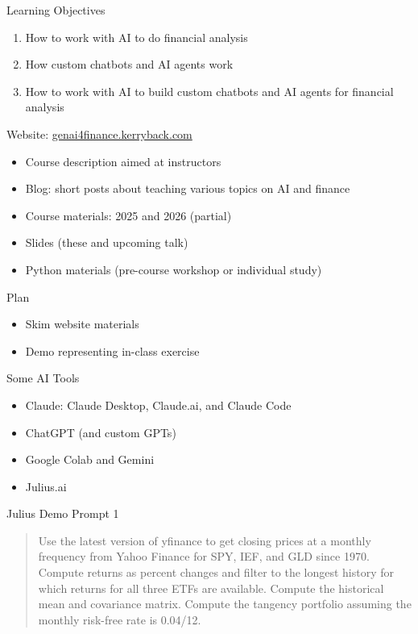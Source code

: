 \documentclass{beamer}
\begin{document}
\begin{frame}{Learning Objectives}
\begin{enumerate}
\item How to work with AI to do financial analysis
\item How custom chatbots and AI agents work 
\item How to work with AI to build custom chatbots and AI agents for financial analysis
\end{enumerate}
\end{frame}

\begin{frame}{Website: \href{https://genai4finance.kerryback.com}{genai4finance.kerryback.com}}
\begin{itemize}
\item Course description aimed at instructors
\item Blog: short posts about teaching various topics on AI and finance 
\item Course materials: 2025 and 2026 (partial)
\item Slides (these and upcoming talk)
\item Python materials (pre-course workshop or individual study)
\end{itemize}
\end{frame} 

\begin{frame}{Plan}
    \begin{itemize}
    \item Skim website materials
    \item Demo representing in-class exercise
    \end{itemize}
\end{frame}

\begin{frame}{Some AI Tools}
    \begin{itemize}
    \item Claude: Claude Desktop, Claude.ai, and Claude Code 
    \item ChatGPT (and custom GPTs)
    \item Google Colab and Gemini
    \item Julius.ai
    \end{itemize}
\end{frame}

\begin{frame}{Julius Demo Prompt 1}
   \begin{quote}
   Use the latest version of yfinance to get closing prices at a monthly frequency from Yahoo Finance for SPY, IEF, and GLD since 1970. Compute returns as percent changes and filter to the longest history for which returns for all three ETFs are available. Compute the historical mean and covariance matrix. Compute the tangency portfolio assuming the monthly risk-free rate is 0.04/12.

   \end{quote}
\end{frame}
\end{document}
